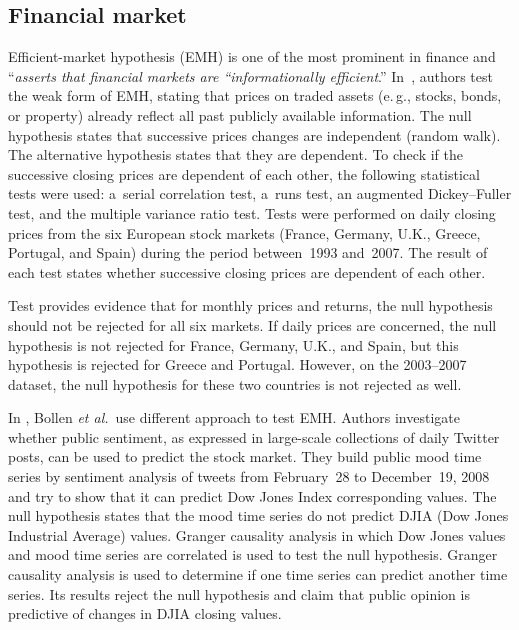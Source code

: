 \begin{multicols}{2}
\subsection{Financial market}

\noindent
  Efficient-market hypothesis (EMH) is one of the most prominent in finance and
``\textit{asserts that financial markets are ``informationally efficient}.''
  In~\cite{75-kl}, authors test the weak form of EMH, stating that prices on traded
assets (e.\,g., stocks, bonds, or property) already reflect all past publicly available
information. The null hypothesis states that successive prices changes are
independent (random walk). The alternative hypothesis states that they are dependent.
To check if the successive closing prices are dependent of each other, the following
statistical tests were used: a~serial correlation test, a~runs test, an augmented
Dickey--Fuller test, and the multiple variance ratio test. Tests were performed on daily closing
prices from the six European stock markets (France, Germany, U.K., Greece,
Portugal, and Spain) during the period between~1993 and~2007. The result of each
test states whether successive closing prices are dependent of each other.

     Test provides evidence that for monthly prices and returns, the null hypothesis
should not be rejected for all six markets. If daily prices are concerned, the null
hypothesis is not rejected for France, Germany, U.K., and Spain, but this hypothesis is
rejected for Greece and Portugal. However, on the 2003--2007 dataset, the null
hypothesis for these two countries is not rejected as well.

  In \cite{76-kl}, Bollen \textit{et al.}\ use different approach to test EMH. Authors
investigate whether public sentiment, as expressed in large-scale collections of daily
Twitter posts, can be used to predict the stock market. They build public mood time
series by sentiment analysis of tweets from February~28 to December~19,
2008 and try to show that it can predict Dow Jones Index corresponding values. The
null hypothesis states that the mood time series do not predict DJIA
(Dow Jones Industrial Average) values. Granger
causality analysis in which Dow Jones values and mood time series are correlated is
used to test the null hypothesis. Granger causality analysis is used to determine if one
time series can predict another time series. Its results reject the null hypothesis and
claim that public opinion is predictive of changes in DJIA closing values.


\end{multicols}
